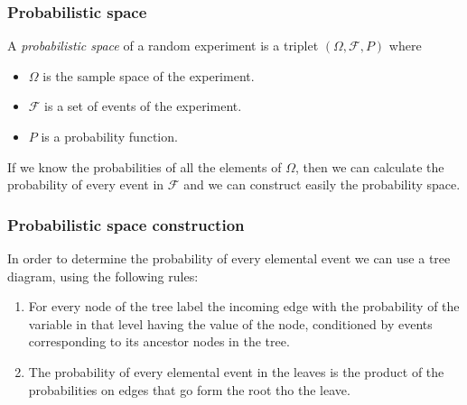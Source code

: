 \begin{frame}
\frametitle{Probabilistic space}
\begin{definition}
A \emph{probabilistic space} of a random experiment is a triplet $(\Omega,\mathcal{F},P)$ where
\begin{itemize}
\item $\Omega$ is the sample space of the experiment.
\item $\mathcal{F}$ is a set of events of the experiment.
\item $P$ is a probability function. 
\end{itemize} 
\end{definition}

If we know the probabilities of all the elements of $\Omega$, then we can calculate the probability of every event in
$\mathcal{F}$ and we can construct easily the probability space. 
\end{frame}


\begin{frame}
\frametitle{Probabilistic space construction}
In order to determine the probability of every elemental event we can use a tree diagram, using the following rules:
\begin{enumerate}
\item For every node of the tree label the incoming edge with the probability of the variable in that level having the
value of the node, conditioned by events corresponding to its ancestor nodes in the tree.
\item The probability of every elemental event in the leaves is the product of the probabilities on edges
that go form the root tho the leave.
\end{enumerate}
\begin{center}
\end{center}
\end{frame}


